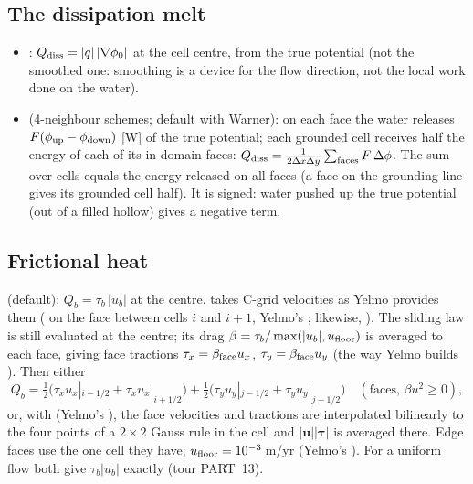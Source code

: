\subsection{The dissipation melt}\label{disc:dissipation}
\begin{itemize}[leftmargin=1.5em]
\item {}: $Q_{\rm diss} = |q|\,|\nabla\phi_0|$ at the cell centre, from the true potential (not
  the smoothed one: smoothing is a device for the flow direction, not the local work done on the water).
\item {} (4-neighbour schemes; default with Warner): on each face the water releases
  $F(\phi_{\rm up}-\phi_{\rm down})$ [W] of the true potential; each grounded cell receives half the energy of each of its
  in-domain faces: $Q_{\rm diss} = \tfrac{1}{2\Delta x\Delta y}\sum_{\rm faces} F\,\Delta\phi$. The sum over cells equals the energy
  released on all faces (a face on the grounding line gives its grounded cell half). It is signed: water pushed up
  the true potential (out of a filled hollow) gives a negative term.
\end{itemize}

\subsection{Frictional heat}\label{disc:friction}
 (default): $Q_b = \tau_b\,|u_b|$ at the centre. 
takes C-grid velocities as Yelmo provides them ( on the face between cells $i$ and $i{+}1$, Yelmo's
;  likewise, ). The sliding law is still evaluated at the centre; its drag
$\beta = \tau_b/\max(|u_b|, u_{\rm floor})$ is averaged to each face, giving face tractions $\tau_x = \beta_{\rm face}u_x$,
$\tau_y = \beta_{\rm face}u_y$ (the way Yelmo builds ). Then either
\begin{equation}
Q_b = \tfrac12\bigl(\tau_x u_x|_{i-1/2} + \tau_x u_x|_{i+1/2}\bigr) + \tfrac12\bigl(\tau_y u_y|_{j-1/2} + \tau_y u_y|_{j+1/2}\bigr)
\quad(\text{faces, } \beta u^2\ge0),
\end{equation}
or, with  (Yelmo's ), the face velocities and tractions are interpolated
bilinearly to the four points of a $2\times2$ Gauss rule in the cell and $|\mathbf u||\boldsymbol\tau|$ is averaged there.
Edge faces use the one cell they have; $u_{\rm floor} = 10^{-3}$\,m/yr (Yelmo's ). For a uniform flow
both give $\tau_b|u_b|$ exactly (tour PART~13).

